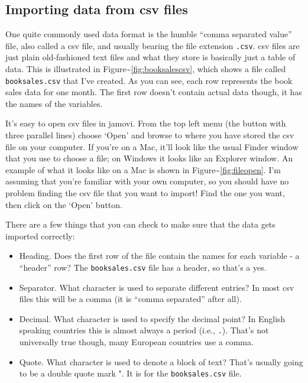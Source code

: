\documentclass[
]{book}
\providecommand{\tightlist}{%
  \setlength{\itemsep}{0pt}\setlength{\parskip}{0pt}}
\begin{document}
\hypertarget{importing-data-from-csv-files}{%
\subsection{Importing data from csv files}\label{importing-data-from-csv-files}}

One quite commonly used data format is the humble ``comma separated value'' file, also called a csv file, and usually bearing the file extension \texttt{.csv}. csv files are just plain old-fashioned text files and what they store is basically just a table of data. This is illustrated in Figure\textasciitilde{}\ref{fig:booksalescsv}, which shows a file called \texttt{booksales.csv} that I've created. As you can see, each row represents the book sales data for one month. The first row doesn't contain actual data though, it has the names of the variables.

It's easy to open csv files in jamovi. From the top left menu (the button with three parallel lines) choose `Open' and browse to where you have stored the csv file on your computer. If you're on a Mac, it'll look like the usual Finder window that you use to choose a file; on Windows it looks like an Explorer window. An example of what it looks like on a Mac is shown in Figure\textasciitilde{}\ref{fig:fileopen}. I'm assuming that you're familiar with your own computer, so you should have no problem finding the csv file that you want to import! Find the one you want, then click on the `Open' button.

There are a few things that you can check to make sure that the data gets imported correctly:

\begin{itemize}
\tightlist
\item
  Heading. Does the first row of the file contain the names for each variable - a ``header'' row? The \texttt{booksales.csv} file has a header, so that's a yes.
\item
  Separator. What character is used to separate different entries? In most csv files this will be a comma (it is ``comma separated'' after all).
\item
  Decimal. What character is used to specify the decimal point? In English speaking countries this is almost always a period (i.e., \texttt{.}). That's not universally true though, many European countries use a comma.
\item
  Quote. What character is used to denote a block of text? That's usually going to be a double quote mark ". It is for the \texttt{booksales.csv} file.
\end{itemize}
\end{document}
